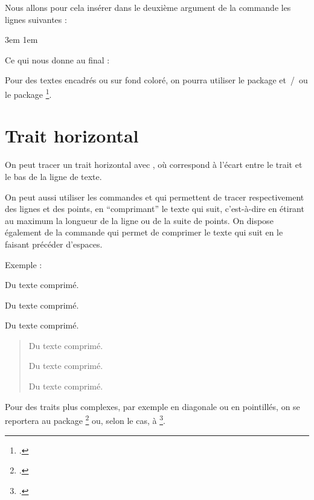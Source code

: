 Nous allons pour cela insérer dans le deuxième argument de la commande  les lignes suivantes :

\begin{latexcode}
\leftmargin 3em
\rightmargin 1em
\itshape
\end{latexcode}

Ce qui nous donne au final :

\begin{latexcode}
\makeatletter
\newenvironment{exemple}
               {\list{}{\listparindent 1.5em%
                        \itemindent    \listparindent
                        \leftmargin 3ex
            \rightmargin 1ex
            \itshape
                        \parsep        \z@ \@plus\p@}%
                \item\relax}
               {\endlist}
\makeatother
\end{latexcode}

\begin{plusloins}
Pour des textes encadrés ou sur fond coloré, on pourra utiliser le package  et~/~ou le package \footcite[On peut également consulter, si on aime les défis de codage en \TeX~/~\LaTeX,][]{frama_boites}. 
\end{plusloins}

\section{Trait horizontal}\label{filets}

On peut tracer un trait horizontal avec  , où  correspond à l'écart entre le trait et le bas de la ligne de texte.

On peut aussi utiliser les commandes  et  qui permettent de tracer respectivement des lignes et des points, en \enquote{comprimant} le texte qui suit, c'est-à-dire en étirant au maximum la longueur de la ligne ou de la suite de points. On dispose également de la commande \label{hfill} qui permet de comprimer le texte qui suit en le faisant précéder d'espaces.

Exemple :

\begin{latexcode}
\hfill Du texte comprimé.

\hrulefill Du texte comprimé.

\dotfill Du texte comprimé.
\end{latexcode}

\begin{quotation}
\hfill Du texte comprimé.

\hrulefill Du texte comprimé.

\dotfill Du texte comprimé.
\end{quotation}

Pour des traits plus complexes, par exemple en diagonale ou en pointillés, on se reportera au package \footcite{eepic} ou, selon le cas, à \footcite{tikz}. 



